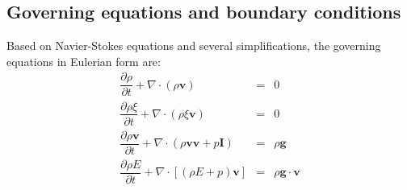 \documentclass[conference,compsoc]{IEEEtran}
\begin{document}
\subsection{Governing equations\cite{suzuki2005numerical} and boundary conditions}
Based on Navier-Stokes equations and several simplifications, the governing equations in Eulerian form are:
\begin{eqnarray} %
\dfrac{\partial \rho}{\partial t} + \nabla \cdot (\rho \textbf{v}) &=& 0 \label{eq:gov-cs-rho} \\
\dfrac{\partial \rho \xi}{\partial t} + \nabla \cdot (\rho \xi \textbf{v}) &=& 0 \label{eq:gov-cs-ks}\\
\dfrac{\partial \rho \textbf{v}}{\partial t} + \nabla \cdot (\rho \textbf{v} \textbf{v} + p\textbf{I}) &=& \rho \textbf{g} \label{eq:gov-cs-v} \\
\dfrac{\partial \rho E}{\partial t} + \nabla \cdot [(\rho E + p )\textbf{v}] &=& \rho \textbf{g} \cdot\textbf{v} \label{eq:gov-cs-e}
\end{eqnarray}
\end{document}
